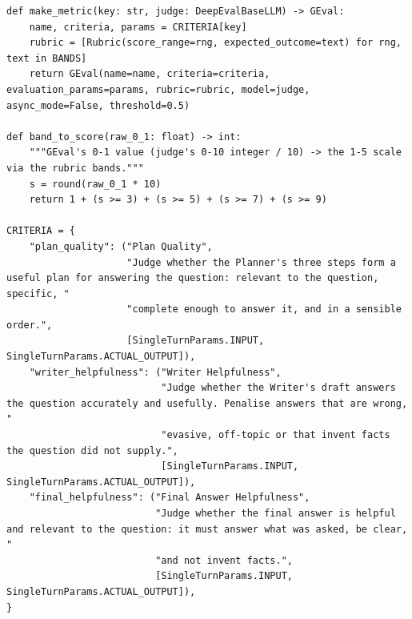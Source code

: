 \documentclass[11pt]{article}
\begin{document}
\begingroup\lstset{basicstyle=\ttfamily\tiny}
\begin{lstlisting}
def make_metric(key: str, judge: DeepEvalBaseLLM) -> GEval:
    name, criteria, params = CRITERIA[key]
    rubric = [Rubric(score_range=rng, expected_outcome=text) for rng, text in BANDS]
    return GEval(name=name, criteria=criteria, evaluation_params=params, rubric=rubric, model=judge, async_mode=False, threshold=0.5)

def band_to_score(raw_0_1: float) -> int:
    """GEval's 0-1 value (judge's 0-10 integer / 10) -> the 1-5 scale via the rubric bands."""
    s = round(raw_0_1 * 10)
    return 1 + (s >= 3) + (s >= 5) + (s >= 7) + (s >= 9)

CRITERIA = {
    "plan_quality": ("Plan Quality",
                     "Judge whether the Planner's three steps form a useful plan for answering the question: relevant to the question, specific, "
                     "complete enough to answer it, and in a sensible order.",
                     [SingleTurnParams.INPUT, SingleTurnParams.ACTUAL_OUTPUT]),
    "writer_helpfulness": ("Writer Helpfulness",
                           "Judge whether the Writer's draft answers the question accurately and usefully. Penalise answers that are wrong, "
                           "evasive, off-topic or that invent facts the question did not supply.",
                           [SingleTurnParams.INPUT, SingleTurnParams.ACTUAL_OUTPUT]),
    "final_helpfulness": ("Final Answer Helpfulness",
                          "Judge whether the final answer is helpful and relevant to the question: it must answer what was asked, be clear, "
                          "and not invent facts.",
                          [SingleTurnParams.INPUT, SingleTurnParams.ACTUAL_OUTPUT]),
}
\end{lstlisting}
\endgroup
\begingroup\lstset{basicstyle=\ttfamily\tiny}
\end{document}
